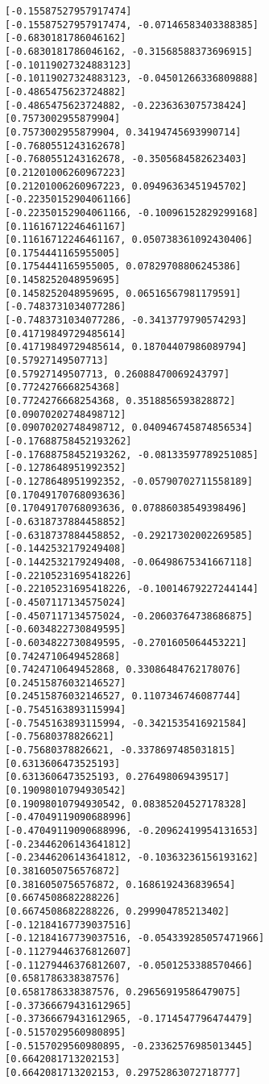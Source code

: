 \documentclass[11pt]{article}
\begin{document}
\begin{Verbatim}[commandchars=\\\{\}]
[-0.15587527957917474]
[-0.15587527957917474, -0.07146583403388385]
[-0.6830181786046162]
[-0.6830181786046162, -0.31568588373696915]
[-0.10119027324883123]
[-0.10119027324883123, -0.04501266336809888]
[-0.4865475623724882]
[-0.4865475623724882, -0.2236363075738424]
[0.7573002955879904]
[0.7573002955879904, 0.34194745693990714]
[-0.7680551243162678]
[-0.7680551243162678, -0.3505684582623403]
[0.21201006260967223]
[0.21201006260967223, 0.09496363451945702]
[-0.22350152904061166]
[-0.22350152904061166, -0.10096152829299168]
[0.11616712246461167]
[0.11616712246461167, 0.050738361092430406]
[0.1754441165955005]
[0.1754441165955005, 0.07829708806245386]
[0.1458252048959695]
[0.1458252048959695, 0.06516567981179591]
[-0.7483731034077286]
[-0.7483731034077286, -0.3413779790574293]
[0.41719849729485614]
[0.41719849729485614, 0.18704407986089794]
[0.57927149507713]
[0.57927149507713, 0.26088470069243797]
[0.7724276668254368]
[0.7724276668254368, 0.3518856593828872]
[0.09070202748498712]
[0.09070202748498712, 0.040946745874856534]
[-0.17688758452193262]
[-0.17688758452193262, -0.08133597789251085]
[-0.1278648951992352]
[-0.1278648951992352, -0.05790702711558189]
[0.17049170768093636]
[0.17049170768093636, 0.07886038549398496]
[-0.6318737884458852]
[-0.6318737884458852, -0.29217302002269585]
[-0.1442532179249408]
[-0.1442532179249408, -0.06498675341667118]
[-0.22105231695418226]
[-0.22105231695418226, -0.10014679227244144]
[-0.4507117134575024]
[-0.4507117134575024, -0.20603764738686875]
[-0.6034822730849595]
[-0.6034822730849595, -0.2701605064453221]
[0.7424710649452868]
[0.7424710649452868, 0.33086484762178076]
[0.24515876032146527]
[0.24515876032146527, 0.1107346746087744]
[-0.7545163893115994]
[-0.7545163893115994, -0.3421535416921584]
[-0.75680378826621]
[-0.75680378826621, -0.3378697485031815]
[0.6313606473525193]
[0.6313606473525193, 0.276498069439517]
[0.19098010794930542]
[0.19098010794930542, 0.08385204527178328]
[-0.47049119090688996]
[-0.47049119090688996, -0.20962419954131653]
[-0.23446206143641812]
[-0.23446206143641812, -0.10363236156193162]
[0.3816050756576872]
[0.3816050756576872, 0.1686192436839654]
[0.6674508682288226]
[0.6674508682288226, 0.299904785213402]
[-0.12184167739037516]
[-0.12184167739037516, -0.054339285057471966]
[-0.11279446376812607]
[-0.11279446376812607, -0.0501253388570466]
[0.6581786338387576]
[0.6581786338387576, 0.29656919586479075]
[-0.37366679431612965]
[-0.37366679431612965, -0.1714547796474479]
[-0.5157029560980895]
[-0.5157029560980895, -0.23362576985013445]
[0.6642081713202153]
[0.6642081713202153, 0.29752863072718777]

\end{Verbatim}
\end{document}
